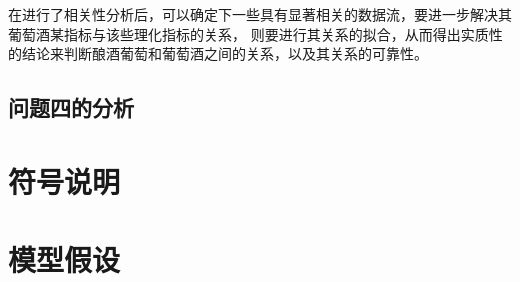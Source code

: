 \documentclass[UTF8]{ctexart}
\begin{document}
		在进行了相关性分析后，可以确定下一些具有显著相关的数据流，要进一步解决其葡萄酒某指标与该些理化指标的关系，
		则要进行其关系的拟合，从而得出实质性的结论来判断酿酒葡萄和葡萄酒之间的关系，以及其关系的可靠性。
		\subsection{问题四的分析}
			

		\section{符号说明}

		\section{模型假设}

  


		
		
		
		
\end{document}
